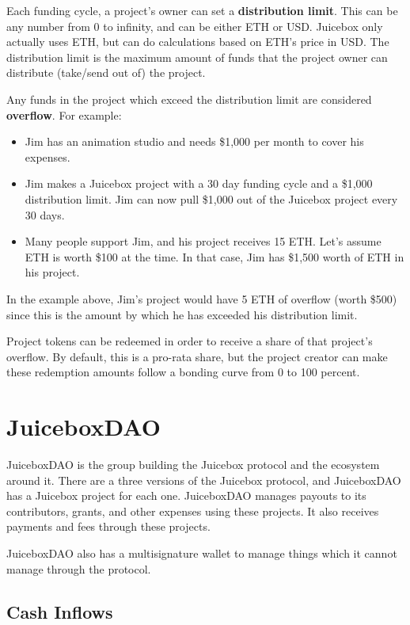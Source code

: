 \documentclass{article}
\begin{document}
Each funding cycle, a project's owner can set a \textbf{distribution limit}. This can be any number from 0 to infinity, and can be either ETH or USD. Juicebox only actually uses ETH, but can do calculations based on ETH's price in USD. The distribution limit is the maximum amount of funds that the project owner can distribute (take/send out of) the project.

Any funds in the project which exceed the distribution limit are considered \textbf{overflow}. For example:

\begin{itemize}
\item Jim has an animation studio and needs \$1,000 per month to cover his expenses.
\item Jim makes a Juicebox project with a 30 day funding cycle and a \$1,000 distribution limit. Jim can now pull \$1,000 out of the Juicebox project every 30 days.
\item Many people support Jim, and his project receives 15 ETH. Let's assume ETH is worth \$100 at the time. In that case, Jim has \$1,500 worth of ETH in his project.
\end{itemize}

In the example above, Jim's project would have 5 ETH of overflow (worth \$500) since this is the amount by which he has exceeded his distribution limit.

Project tokens can be redeemed in order to receive a share of that project's overflow. By default, this is a pro-rata share, but the project creator can make these redemption amounts follow a bonding curve from 0 to 100 percent.

\section{JuiceboxDAO}

JuiceboxDAO is the group building the Juicebox protocol and the ecosystem around it. There are a three versions of the Juicebox protocol, and JuiceboxDAO has a Juicebox project for each one. JuiceboxDAO manages payouts to its contributors, grants, and other expenses using these projects. It also receives payments and fees through these projects. 

JuiceboxDAO also has a multisignature wallet to manage things which it cannot manage through the protocol.

\subsection{Cash Inflows}
\end{document}
